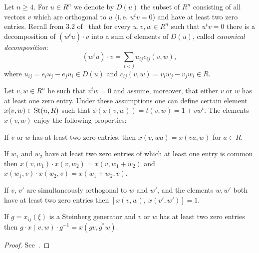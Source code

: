 Let $n \geq 4$. For $u \in R^n$ we denote by $D(u)$ the subset of $R^n$ consisting of all vectors $v$ which are orthogonal to $u$
(i.\,e. $u^{t} v = 0$) and have at least two zero entries.
Recall from 3.2 of~\cite{Ka77} that for every $u, v, w \in R^n$ such that $u^t v = 0$ there
is a decomposition of $(w^t u) \cdot v$ into a sum of elements of $D(u)$, called \textit{canonical decomposition}:
\begin{equation}
    \label{eq:canonical} (w^tu) \cdot v=\sum_{i<j}u_{ij} c_{ij}(v, w),
\end{equation}
where $u_{ij} =e_i u_j-e_j u_i \in D(u)$ and $c_{ij}(v, w) =v_i w_j-v_j w_i \in R$.

\begin{lemma}
    \label{lem:xsmall-properties}
    Let $v, w \in R^n$ be such that $v^t w = 0$ and assume, moreover, that either $v$ or $w$ has at least one zero entry.
    Under these assumptions one can define certain element $x(v, w) \in \operatorname{St}(n, R)$ such that $\phi(x(v, w)) = t(v, w) = 1 + vw^t$.
    The elements $x(v, w)$ enjoy the following properties:
    \begin{lemlist}
        \item \label{itm:xsmall-scalar} If $v$ or $w$ has at least two zero entries, then $x(v, wa) = x(va, w)$ for $a\in R$.
        \item \label{itm:xsmall-additivity} If $w_1$ and $w_2$ have at least two zero entries of which at least one entry is common
        then $x(v, w_1) \cdot x(v, w_2) = x(v, w_1+w_2)$ and $x(w_1, v) \cdot x(w_2, v) = x(w_1 + w_2, v)$.
        \item \label{itm:xsmall-commute} If $v$, $v'$ are simultaneously orthogonal to $w$ and $w'$, and the elements $w, w'$ both have at least two zero entries then
        $[x(v, w),\ x(v', w')] = 1$.
        \item \label{itm:xsmall-conj} If $g = x_{ij}(\xi)$ is a Steinberg generator and $v$ or $w$ has at least two zero entries then
        $g \cdot x(v, w) \cdot g^{-1} = x(gv, g^*w)$.
    \end{lemlist}
\end{lemma}
\begin{proof}
    See~\cite[Lemma~1.1]{Tu83}.
\end{proof}

